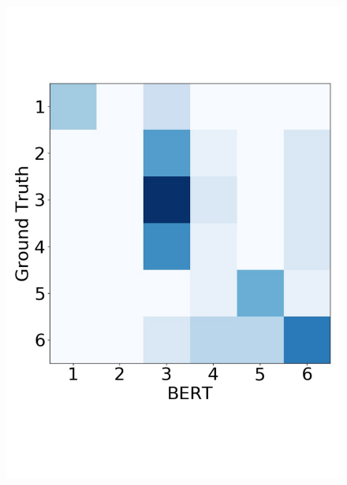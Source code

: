 \begin{figure}
{\begin{minipage}{0.25\linewidth}
			\includegraphics[width=1\linewidth]{BERT_6_pair}\vspace{-1.75cm}

\end{minipage}}
\end{figure}
